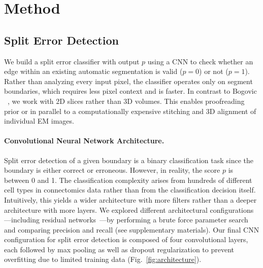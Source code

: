 

\section{Method}
\label{sec:methods}

\subsection{Split Error Detection}
\label{sec:spliterrordetection}

We build a split error classifier with output $p$ using a CNN to check whether an edge within an existing automatic segmentation is valid ($p=0$) or not ($p=1$). Rather than analyzing every input pixel, the classifier operates only on segment boundaries, which requires less pixel context and is faster. In contrast to Bogovic \etal~\cite{BogovicHJ13}, we work with 2D slices rather than 3D volumes. This enables proofreading prior or in parallel to a computationally expensive stitching and 3D alignment of individual EM images.

\paragraph{Convolutional Neural Network Architecture.} Split error detection of a given boundary is a binary classification task since the boundary is either correct or erroneous. However, in reality, the score $p$ is between 0 and 1. The classification complexity arises from hundreds of different cell types in connectomics data rather than from the classification decision itself. Intuitively, this yields a wider architecture with more filters rather than a deeper architecture with more layers. We explored different architectural configurations---including residual networks~\cite{resnet}---by performing a brute force parameter search and comparing precision and recall (see supplementary materials). Our final CNN configuration for split error detection is composed of four convolutional layers, each followed by max pooling as well as dropout regularization to prevent overfitting due to limited training data (Fig.~\ref{fig:architecture}).

